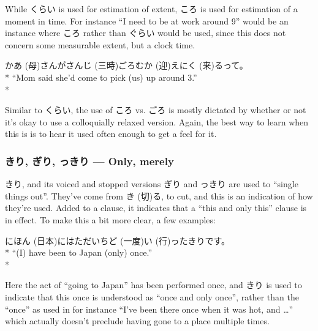 \documentclass[11pt, b5paper, twoside, openright, onecolumn]{book}
\makeatletter
\newcommand*{\rubystack}[2]{{\relscale{0.5}%
  \begin{tabular}[b]{@{}c@{}}%
    {#1}\\%
   {\textscale{2}{#2}}%
  \end{tabular}}%
}
\DeclareRobustCommand*{\ruby}[2]{%
  \mbox{%
    \setlength{\parskip}{0ex}%
    \BeginAccSupp{method=pdfstringdef,ActualText={#1}}%
      \rubystack{\phantom{#2}}{#1}%
      \llap{%
        \rubystack{#2}{\phantom{#1}}%
      }%
    \EndAccSupp{}%
  }%
}
\renewcommand*{\ruby}[2]{#2 (#1)}%
\newenvironment{exampleblock}{
\setlength{\parindent}{0.6in}
\begin{minipage}[t]{\dimexpr\textwidth-\parindent}}
{\end{minipage}}
\makeatother
\begin{document}
While くらい is used for estimation of extent‚ ころ is used for estimation of a moment in time. For instance “I need to be at work around 9” would be an instance where ころ rather than ぐらい would be used‚ since this does not concern some measurable extent‚ but a clock time.

\vspace{0.4cm}
\begin{exampleblock}
\ruby{母}{かあ}さんが\ruby{三時}{さんじ}ごろ\ruby{迎}{むか}えに\ruby{来}{く}るって。 \\* 
“Mom said she’d come to pick (us) up around 3.” \\* 
\end{exampleblock}
\vspace{0.2cm}

Similar to くらい‚ the use of ころ vs. ごろ is mostly dictated by whether or not it’s okay to use a colloquially relaxed version. Again‚ the best way to learn when this is is to hear it used often enough to get a feel for it.

\subsubsection{きり‚ ぎり‚ っきり — Only‚ merely}

きり‚ and its voiced and stopped versions ぎり and っきり are used to “single things out”. They’ve come from \ruby{切}{き}る‚ to cut‚ and this is an indication of how they’re used. Added to a clause‚ it indicates that a “this and only this” clause is in effect. To make this a bit more clear‚ a few examples:

\vspace{0.4cm}
\begin{exampleblock}
\ruby{日本}{にほん}にはただ\ruby{一度}{いちど}\ruby{行}{い}ったきりです。 \\* 
“(I) have been to Japan (only) once.” \\* 
\end{exampleblock}
\vspace{0.2cm}

Here the act of “going to Japan” has been performed once‚ and きり is used to indicate that this once is understood as “once and only once”‚ rather than the “once” as used in for instance “I’ve been there once when it was hot‚ and …” which actually doesn’t preclude having gone to a place multiple times.
\end{document}
